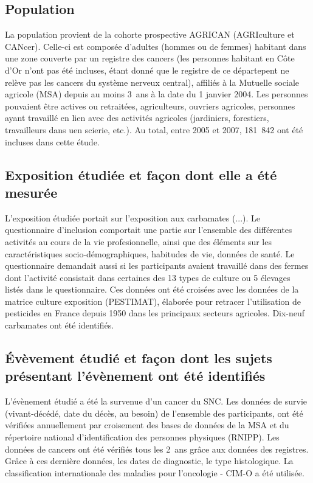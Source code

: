 \documentclass[10pt]{article}
\begin{document}
\subsection{Population}
La population provient de la cohorte prospective AGRICAN (AGRIculture et CANcer). Celle-ci est composée d'adultes (hommes ou de femmes) habitant dans une zone couverte par un registre des cancers (les personnes habitant en Côte d'Or n'ont pas été incluses, étant donné que le registre de ce départepent ne relève pas les cancers du système nerveux central), affiliés à la Mutuelle sociale agricole (MSA) depuis au moins 3~ans à la date du 1 janvier 2004. Les personnes pouvaient être actives ou retraitées, agriculteurs, ouvriers agricoles, personnes ayant travaillé en lien avec des activités agricoles (jardiniers, forestiers, travailleurs dans uen scierie, etc.). Au total, entre 2005 et 2007, 181~842 ont été incluses dans cette étude.

\subsection{Exposition étudiée et façon dont elle a été mesurée}
\label{exposition}
L'exposition étudiée portait sur l'exposition aux carbamates (...). Le questionnaire d'inclusion comportait une partie sur l'ensemble des différentes activités au cours de la vie profesionnelle, ainsi que des éléments sur les caractéristiques socio-démographiques, habitudes de vie, données de santé. Le questionnaire demandait aussi si les participants avaient travaillé dans des fermes dont l'activité consistait dans certaines des 13 types de culture ou 5 élevages listés dans le questionnaire. Ces données ont été croisées avec les données de la matrice culture exposition (PESTIMAT), élaborée pour retracer l'utilisation de pesticides en France depuis 1950 dans les principaux secteurs agricoles. Dix-neuf carbamates ont été identifiés.

\subsection{\'{E}vèvement étudié et façon dont les sujets présentant l'évènement ont été identifiés}
L'évènement étudié a été la survenue d'un cancer du SNC. Les données de survie (vivant-décédé, date du décès, au besoin) de l'ensemble des participants, ont été vérifiées annuellement par croisement des bases de données de la MSA et du répertoire national d'identification des personnes physiques (RNIPP). Les données de cancers ont été vérifiés tous les 2~ans grâce aux données des registres. Grâce à ces dernière données, les dates de diagnostic, le type histologique. La classification internationale des maladies pour l'oncologie - CIM-O a été utilisée.
\end{document}
